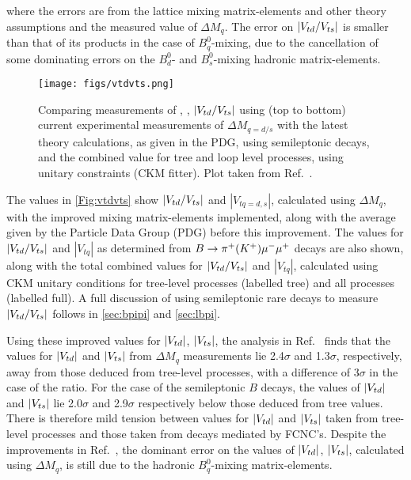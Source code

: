 where the errors are from the lattice mixing matrix-elements and other theory assumptions and the measured value of $\Delta M_{q}$. The error on $|{V_{{t}{d}}}/{V_{{t}{s}}}|$ is smaller than that of its products in the case of $B^{0}_{q}$-mixing, due to the cancellation of some dominating errors on the $B^{0}_{d}$- and $B^{0}_{s}$-mixing hadronic matrix-elements. %
\begin{figure}
\texttt{[image: figs/vtdvts.png]}
\caption{Comparing measurements of \Vtd, \Vts, $|{V_{{t}{d}}}/{V_{{t}{s}}}|$ using (top to bottom) current experimental measurements of $\Delta M_{q = d/s}$ with the latest theory calculations, as given in the PDG\cite{pdg},  using semileptonic decays, and the combined value for tree and loop level processes, using unitary constraints (CKM fitter\cite{ckm}). Plot taken from Ref.~\cite{vtdvts}.}
\label{Fig:vtdvts}
\end{figure}

The values in \autoref{Fig:vtdvts} show $|{V_{{t}{d}}}/{V_{{t}{s}}}|$ and $|V_{tq = d,s}|$, calculated using $\Delta M_{q}$, with the improved mixing matrix-elements implemented, along with the average given by the Particle Data Group (PDG)\cite{pdg} before this improvement. The values for $|{V_{{t}{d}}}/{V_{{t}{s}}}|$ and $|V_{tq}|$ as determined from ${B}\rightarrow{\ensuremath{{\pi}^+}}({K}^{+}){\mu^-}{\mu^+}$ decays are also shown, along with the total combined values for $|{V_{{t}{d}}}/{V_{{t}{s}}}|$ and $|V_{tq}|$, calculated using CKM unitary conditions for tree-level processes (labelled tree) and all processes (labelled full). A full discussion of using semileptonic rare decays to measure $|{V_{{t}{d}}}/{V_{{t}{s}}}|$ follows in \autoref{sec:bpipi} and \autoref{sec:lbpi}.    %

Using these improved values for $|{V_{{t}{d}}}|$, $|{V_{{t}{s}}}|$, the analysis in Ref.~\cite{vtdvts} finds that the values for $|{V_{{t}{d}}}|$ and $|{V_{{t}{s}}}|$ from $\Delta M_{q}$ measurements lie 2.4$\sigma$ and 1.3$\sigma$, respectively, away from those deduced from tree-level processes, with a difference of 3$\sigma$ in the case of the ratio. For the case of the semileptonic $B$ decays, the values of $|{V_{{t}{d}}}|$ and $|{V_{{t}{s}}}|$ lie  2.0$\sigma$ and 2.9$\sigma$ respectively below those deduced from tree values. 
There is therefore mild tension between values for $|{V_{{t}{d}}}|$ and $|{V_{{t}{s}}}|$ taken from tree-level processes and those taken from decays mediated by FCNC's. Despite the improvements in Ref.~\cite{vtdvts}, the dominant error on the values of $|{V_{{t}{d}}}|$, $|{V_{{t}{s}}}|$, calculated using $\Delta M_{q}$, is still due to the hadronic $B^{0}_{q}$-mixing matrix-elements.

